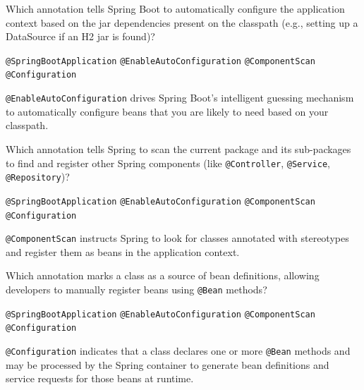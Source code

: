 \question[4]
Which annotation tells Spring Boot to automatically configure the application context based on the jar dependencies present on the classpath (e.g., setting up a DataSource if an H2 jar is found)?
\begin{choices}
  \choice \texttt{@SpringBootApplication}
  \CorrectChoice \texttt{@EnableAutoConfiguration}
  \choice \texttt{@ComponentScan}
  \choice \texttt{@Configuration}
\end{choices}
\begin{solution}
  \texttt{@EnableAutoConfiguration} drives Spring Boot's intelligent guessing mechanism to automatically configure beans that you are likely to need based on your classpath.
\end{solution}

\question[4]
Which annotation tells Spring to scan the current package and its sub-packages to find and register other Spring components (like \texttt{@Controller}, \texttt{@Service}, \texttt{@Repository})?
\begin{choices}
  \choice \texttt{@SpringBootApplication}
  \choice \texttt{@EnableAutoConfiguration}
  \CorrectChoice \texttt{@ComponentScan}
  \choice \texttt{@Configuration}
\end{choices}
\begin{solution}
  \texttt{@ComponentScan} instructs Spring to look for classes annotated with stereotypes and register them as beans in the application context.
\end{solution}

\question[4]
Which annotation marks a class as a source of bean definitions, allowing developers to manually register beans using \texttt{@Bean} methods?
\begin{choices}
  \choice \texttt{@SpringBootApplication}
  \choice \texttt{@EnableAutoConfiguration}
  \choice \texttt{@ComponentScan}
  \CorrectChoice \texttt{@Configuration}
\end{choices}
\begin{solution}
  \texttt{@Configuration} indicates that a class declares one or more \texttt{@Bean} methods and may be processed by the Spring container to generate bean definitions and service requests for those beans at runtime.
\end{solution}


